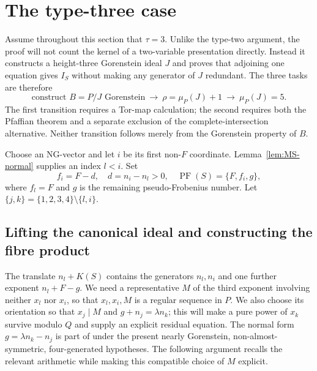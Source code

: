 \documentclass[10pt]{amsart}
\theoremstyle{plain}
\begin{document}
\section{The type-three case}\label{sec:type3}

Assume throughout this section that \(\tau=3\).  Unlike the type-two
argument, the proof will not count the kernel of a two-variable
presentation directly.  Instead it constructs a height-three Gorenstein
ideal \(J\) and proves that adjoining one equation gives \(I_S\) without
making any generator of \(J\) redundant.  The three tasks are therefore
\[
\text{construct \(B=P/J\) Gorenstein}
\ \longrightarrow\ \rho=\mu_P(J)+1
\ \longrightarrow\ \mu_P(J)=5.
\]
The first transition requires a Tor-map calculation; the second requires
both the Pfaffian theorem and a separate exclusion of the
complete-intersection alternative.  Neither transition follows merely
from the Gorenstein property of \(B\).

Choose an NG-vector and let \(i\) be its first non-\(F\) coordinate.
Lemma~\ref{lem:MS-normal} supplies an index \(l<i\).  Set
\begin{equation}\label{eq:type3-PF-data}
f_i=F-d,\quad d=n_i-n_l>0,\quad
\operatorname{PF}(S)=\{F,f_i,g\},
\end{equation}
where \(f_l=F\) and \(g\) is the remaining pseudo-Frobenius number.
Let \(\{j,k\}=\{1,2,3,4\}\setminus\{l,i\}\).

\subsection{Lifting the canonical ideal and constructing the fibre product}

The translate \(n_l+K(S)\) contains the generators \(n_l,n_i\) and one
further exponent \(n_l+F-g\).  We need a representative \(M\) of the
third exponent involving neither \(x_l\) nor \(x_i\), so that
\(x_l,x_i,M\) is a regular sequence in \(P\).  We also choose its
orientation so that \(x_j\mid M\) and \(g+n_j=\lambda n_k\); this
will make a pure power of \(x_k\) survive modulo \(Q\) and supply an
explicit residual equation.  The normal form
\(g=\lambda n_k-n_j\) is part of \cite[Theorem~2.4]{MS21} under the
present nearly Gorenstein, non-almost-symmetric, four-generated
hypotheses.  The following argument recalls the relevant arithmetic
while making this compatible choice of \(M\) explicit.
\end{document}
